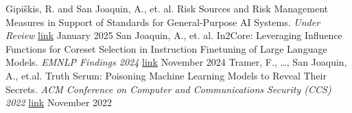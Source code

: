 \documentclass[]{awesome-cv}
\makeatletter
\renewcommand*{\cventry}[5]{%
  \vspace{-2.0mm}
  \setlength\tabcolsep{0pt}
  \setlength{\extrarowheight}{0pt}
  \begin{tabular*}{\textwidth}{@{\extracolsep{\fill}} L{\textwidth - 4.5cm} R{4.5cm}}
    \ifempty{#2#3}
      {\ifempty{#1#4}{}{\entrypositionstyle{#1} & \entrydatestyle{#4} \\}}
      {\entrytitlestyle{#2} & \entrylocationstyle{#3} 
       \ifempty{#1#4}{}{\\\entrypositionstyle{#1} & \entrydatestyle{#4}}}
    \ifempty{#5}{}{\\\multicolumn{2}{L{\textwidth}}{\descriptionstyle{#5}}}
  \end{tabular*}%
  \par %
}
\makeatother
\begin{document}
\vspace{-3mm}
\vspace{-3mm}
\begin{cvhonors}
	\cvhonor
	{\textnormal{Gipiškis, R. and} San Joaquin, A., \textnormal{et. al.} }
	{Risk Sources and Risk Management Measures in Support of Standards for General-Purpose AI Systems. \textit{Under Review}}
	{\href{https://arxiv.org/pdf/2410.23472}{link}}
	{January 2025}
	\cvhonor
	{San Joaquin, A., \textnormal{et. al.} }
	{In2Core: Leveraging Influence Functions for Coreset Selection in Instruction Finetuning of Large Language Models. \textit{EMNLP Findings 2024} }
	{\href{https://arxiv.org/abs/2212.01933}{link}}
	{November 2024}
	\cvhonor
	{\textnormal{Tramer, F., \dots ,} San Joaquin, A., \textnormal{ et.al.} }
	{Truth Serum: Poisoning Machine Learning Models to Reveal Their Secrets. \textit{ACM Conference on Computer and Communications Security (CCS) 2022}}
	{\href{https://dl.acm.org/doi/10.1145/3548606.3560554}{link}}
	{November 2022}
\end{cvhonors}

\vspace{-6mm}


\vspace{-20mm}
\end{document}
